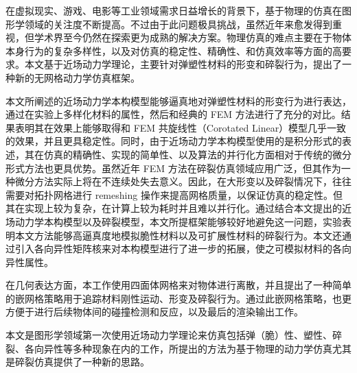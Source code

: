 \begin{cabstract}
在虚拟现实、游戏、电影等工业领域需求日益增长的背景下，基于物理的仿真在图形学领域的关注度不断提高。不过由于此问题极具挑战，虽然近年来愈发得到重视，但学术界至今仍然在探索更为成熟的解决方案。物理仿真的难点主要在于物体本身行为的复杂多样性，以及对仿真的稳定性、精确性、和仿真效率等方面的高要求。本文基于近场动力学理论，主要针对弹塑性材料的形变和碎裂行为，提出了一种新的无网格动力学仿真框架。

本文所阐述的近场动力学本构模型能够逼真地对弹塑性材料的形变行为进行表达，通过在实验上多样化材料的属性，然后和经典的 FEM 方法进行了充分的对比。结果表明其在效果上能够取得和 FEM 共旋线性（Corotated Linear）模型几乎一致的效果，并且更具稳定性。同时，由于近场动力学本构模型使用的是积分形式的表述，其在仿真的精确性、实现的简单性、以及算法的并行化方面相对于传统的微分形式方法也更具优势。虽然近年 FEM 方法在碎裂仿真领域应用广泛，但其作为一种微分方法实际上将在不连续处失去意义。因此，在大形变以及碎裂情况下，往往需要对拓扑网格进行 remeshing 操作来提高网格质量，以保证仿真的稳定性。但其在实现上较为复杂，在计算上较为耗时并且难以并行化。通过结合本文提出的近场动力学本构模型以及碎裂模型，本文所提框架能够较好地避免这一问题，实验表明本文方法能够高逼真度地模拟脆性材料以及可扩展性材料的碎裂行为。本文还通过引入各向异性矩阵核来对本构模型进行了进一步的拓展，使之可模拟材料的各向异性属性。

在几何表达方面，本工作使用四面体网格来对物体进行离散，并且提出了一种简单的嵌网格策略用于追踪材料刚性运动、形变及碎裂行为。通过此嵌网格策略，也更方便于进行后续物体间的碰撞检测和反应，以及最后的渲染输出工作。

本文是图形学领域第一次使用近场动力学理论来仿真包括弹（脆）性、塑性、碎裂、各向异性等多种现象在内的工作，所提出的方法为基于物理的动力学仿真尤其是碎裂仿真提供了一种新的思路。

\end{cabstract}

